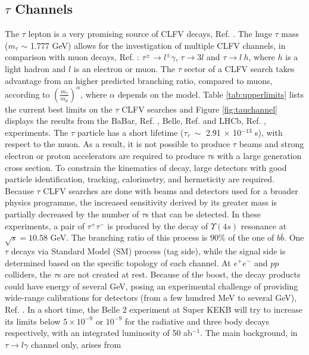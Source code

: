 \subsection{$\tau$ Channels}
The $\tau$ lepton is a very promising source of CLFV decays, Ref. \cite{universe8060299}. 
The huge $\tau$ mass ($m_\tau$ $\sim$ 1.777 GeV) allows for the investigation of multiple CLFV channels, in comparison with muon decays, Ref. \cite{clfv_signorelli}: 
$\tau^\pm \rightarrow l^\pm \gamma$, $\tau \rightarrow 3l$ and $\tau\rightarrow l \ h$, 
where $h$ is a light hadron and $l$ is an electron or muon. The $\tau$ sector of a CLFV search takes advantage from an higher predicted branching ratio, compared to muons, 
according to $(\frac{m_\tau}{m_\mu})^\alpha$, where $\alpha$ depends on the model. Table \ref{tab:upperlimits} lists the current best limits on the $\tau$ 
CLFV searches and Figure \ref{fig:tauchannel} displays the results from the BaBar, Ref. \cite{PhysRevD.77.091104}, Belle, Ref. \cite{ABASHIAN2002117} and LHCb, 
Ref. \cite{TheLHCbCollaboration2008}, experiments. The $\tau$ particle has a short lifetime ($\tau_\tau \ \sim$ 2.91 $\times$ 10$^{-13}$ s), with respect to the muon.
As a result, it is not possible to produce $\tau$ beams and strong electron or proton accelerators are required to produce $\tau$s with a large generation cross section. 
To constrain the kinematics of decay, large detectors with good particle identification, tracking, calorimetry, and hermeticity are required. 
Because $\tau$ CLFV searches are done with beams and detectors used for a broader physics programme, 
the increased sensitivity derived by its greater mass is partially decreased by the number of $\tau$s that can be detected.
In these experiments, a pair of $\tau^+ \tau^-$ is produced by the decay of $\Upsilon(4s)$ resonance at $\sqrt{s}=10.58$ GeV. The branching ratio of this process is  $90\%$ of 
the one of $b \bar{b}$. One $\tau$ decays via Standard Model (SM) process (tag side), while the signal side is determined based on the specific topology of each channel. 
At $e^+ e^-$ and $pp$ colliders, the $\tau$s are not created at rest. Because of the boost, the decay products could have 
energy of several GeV, posing an experimental challenge of providing wide-range calibrations for detectors (from a few hundred MeV to several GeV), Ref. \cite{universe8060299}.
In a short time, the Belle 2 experiment at Super KEKB will try to increase its limits below $5 \times 10^{-9}$ or $10^{-9}$ for the radiative and three body decays respectively, 
with an integrated luminosity of 50 ab$^{-1}$. The main background, in $\tau \rightarrow l \gamma$ channel only, arises from
